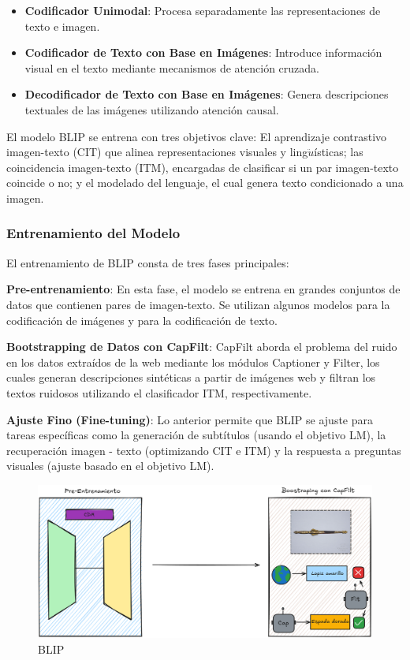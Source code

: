 			\begin{itemize}
				\item \textbf{Codificador Unimodal}: Procesa separadamente las representaciones de texto e imagen.
				\item \textbf{Codificador de Texto con Base en Imágenes}: Introduce información visual en el texto mediante mecanismos de atención cruzada.
				\item \textbf{Decodificador de Texto con Base en Imágenes}: Genera descripciones textuales de las imágenes utilizando atención causal.
			\end{itemize}

			El modelo BLIP se entrena con tres objetivos clave: El aprendizaje contrastivo imagen-texto (CIT) que alinea representaciones visuales y ling$\ddot{u}$ísticas; las coincidencia imagen-texto (ITM), encargadas de clasificar si un par imagen-texto coincide o no; y el modelado del lenguaje, el cual genera texto condicionado a una imagen.

		\subsubsection*{Entrenamiento del Modelo}

			El entrenamiento de BLIP consta de tres fases principales:

			\textbf{Pre-entrenamiento}: En esta fase, el modelo se entrena en grandes conjuntos de datos que contienen pares de imagen-texto. Se utilizan algunos modelos para la codificación de imágenes y para la codificación de texto. 

			\textbf{Bootstrapping de Datos con CapFilt}: CapFilt aborda el problema del ruido en los datos extraídos de la web mediante los módulos Captioner y Filter, los cuales generan descripciones sintéticas a partir de imágenes web y filtran los textos ruidosos utilizando el clasificador ITM, respectivamente.

			\textbf{Ajuste Fino (Fine-tuning)}: Lo anterior permite que BLIP se ajuste para tareas específicas como la generación de subtítulos (usando el objetivo LM), la recuperación imagen - texto (optimizando CIT e ITM) y la respuesta a preguntas visuales (ajuste basado en el objetivo LM).

			\begin{figure}[h] 
				\centering
				\includegraphics[width=1\textwidth]{Graphics/BLIP} 
				\caption{BLIP}
				\label{fig:BLIP}
			\end{figure}

